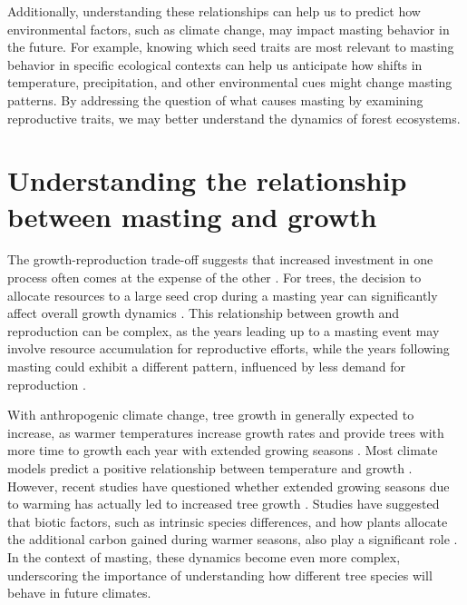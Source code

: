 \documentclass[11pt,letter]{article}
\begin{document}
Additionally, understanding these relationships can help us to predict how environmental factors, such as climate change, may impact masting behavior in the future. For example, knowing which seed traits are most relevant to masting behavior in specific ecological contexts can help us anticipate how shifts in temperature, precipitation, and other environmental cues might change masting patterns. By addressing the question of what causes masting by examining reproductive traits, we may better understand the dynamics of forest ecosystems.

\section{Understanding the relationship between masting and growth}
The growth-reproduction trade-off suggests that increased investment in one process often comes at the expense of the other \citep{grime1977evidence, stearns1998evolution}. For trees, the decision to allocate resources to a large seed crop during a masting year can significantly affect overall growth dynamics \citep{hacket2016tree}. This relationship between growth and reproduction can be complex, as the years leading up to a masting event may involve resource accumulation for reproductive efforts, while the years following masting could exhibit a different pattern, influenced by less demand for reproduction \citep{kelly1994evolutionary}.

With anthropogenic climate change, tree growth in generally expected to increase, as warmer temperatures increase growth rates and provide trees with more time to growth each year with extended growing seasons \citep{keenan2014net, finzi2020carbon}. Most climate models predict a positive relationship between temperature and growth \citep{friedlingstein2022global, ito2020global}. However, recent studies have questioned whether extended growing seasons due to warming has actually led to increased tree growth \citep{dow2022warm, green2022limits}. Studies have suggested that biotic factors, such as intrinsic species differences, and how plants allocate the additional carbon gained during warmer seasons, also play a significant role \citep{hacket2016consistent}. In the context of masting, these dynamics become even more complex, underscoring the importance of understanding how different tree species will behave in future climates.
\end{document}
